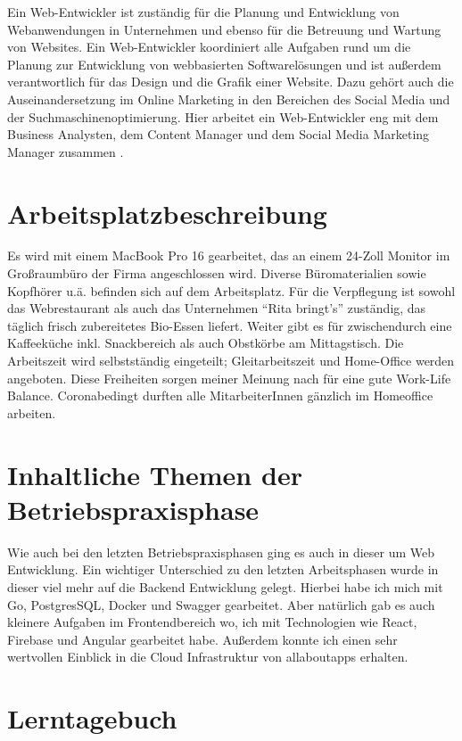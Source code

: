 \grqq{}Ein Web-Entwickler ist zuständig für die Planung und Entwicklung von Webanwendungen in Unternehmen und ebenso für die Betreuung und Wartung von Websites. Ein Web-Entwickler koordiniert alle Aufgaben rund um die Planung zur Entwicklung von webbasierten Softwarelösungen und ist außerdem verantwortlich für das Design und die Grafik einer Website. Dazu gehört auch die Auseinandersetzung im Online Marketing in den Bereichen des Social Media und der Suchmaschinenoptimierung. Hier arbeitet ein Web-Entwickler eng mit dem Business Analysten, dem Content Manager und dem Social Media Marketing Manager zusammen\grqq{} \cite{webdev}.

\section{Arbeitsplatzbeschreibung}

Es wird mit einem MacBook Pro 16 gearbeitet, das an einem 24-Zoll Monitor im Großraumbüro der Firma angeschlossen wird. Diverse Büromaterialien sowie Kopfhörer u.ä. befinden sich auf dem Arbeitsplatz. Für die Verpflegung ist sowohl das Webrestaurant als auch das Unternehmen “Rita bringt’s” zuständig, das täglich frisch zubereitetes Bio-Essen liefert. Weiter gibt es für zwischendurch eine Kaffeeküche inkl. Snackbereich als auch Obstkörbe am Mittagstisch. Die Arbeitszeit wird selbstständig eingeteilt; Gleitarbeitszeit und Home-Office werden angeboten. Diese Freiheiten sorgen meiner Meinung nach für eine gute Work-Life Balance. Coronabedingt durften alle MitarbeiterInnen gänzlich im Homeoffice arbeiten.

\section{Inhaltliche Themen der Betriebspraxisphase}
Wie auch bei den letzten Betriebspraxisphasen ging es auch in dieser um Web Entwicklung. Ein wichtiger Unterschied zu den letzten Arbeitsphasen wurde in dieser viel mehr auf die Backend Entwicklung gelegt. Hierbei habe ich mich mit Go\cite{go}\cite{gostarter}, PostgresSQL\cite{psql}, Docker\cite{docker} und Swagger\cite{goswagger}\cite{swagger} gearbeitet. Aber natürlich gab es auch kleinere Aufgaben im Frontendbereich wo, ich mit Technologien wie React\cite{react}, Firebase\cite{firebase} und Angular\cite{angular} gearbeitet habe. Außerdem konnte ich einen sehr wertvollen Einblick in die Cloud Infrastruktur von allaboutapps erhalten. 

\section{Lerntagebuch}

